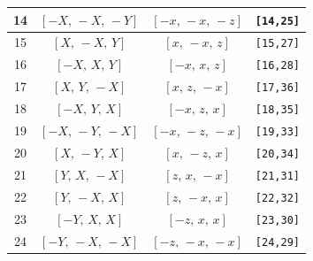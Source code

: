 \documentclass[fleqn,8pt]{jsarticle}
\begin{document}
\begin{longtable}{cccc}
14 & $\left[ - X,\, - X,\, - Y \right]$ & $\left[ - x,\, - x,\, - z \right]$ & {\tt [14,25]} \\ \hline
15 & $\left[ X,\, - X,\, Y \right]$ & $\left[ x,\, - x,\, z \right]$ & {\tt [15,27]} \\ \hline
16 & $\left[ - X,\, X,\, Y \right]$ & $\left[ - x,\, x,\, z \right]$ & {\tt [16,28]} \\ \hline
17 & $\left[ X,\, Y,\, - X \right]$ & $\left[ x,\, z,\, - x \right]$ & {\tt [17,36]} \\ \hline
18 & $\left[ - X,\, Y,\, X \right]$ & $\left[ - x,\, z,\, x \right]$ & {\tt [18,35]} \\ \hline
19 & $\left[ - X,\, - Y,\, - X \right]$ & $\left[ - x,\, - z,\, - x \right]$ & {\tt [19,33]} \\ \hline
20 & $\left[ X,\, - Y,\, X \right]$ & $\left[ x,\, - z,\, x \right]$ & {\tt [20,34]} \\ \hline
21 & $\left[ Y,\, X,\, - X \right]$ & $\left[ z,\, x,\, - x \right]$ & {\tt [21,31]} \\ \hline
22 & $\left[ Y,\, - X,\, X \right]$ & $\left[ z,\, - x,\, x \right]$ & {\tt [22,32]} \\ \hline
23 & $\left[ - Y,\, X,\, X \right]$ & $\left[ - z,\, x,\, x \right]$ & {\tt [23,30]} \\ \hline
24 & $\left[ - Y,\, - X,\, - X \right]$ & $\left[ - z,\, - x,\, - x \right]$ & {\tt [24,29]} \\
\end{longtable}
\renewcommand{\arraystretch}{1.2}
\end{document}
